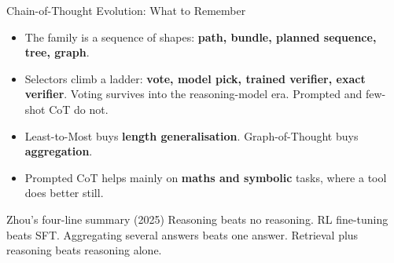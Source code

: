 \begin{frame}{Chain-of-Thought Evolution: What to Remember}
    \begin{itemize}\itemsep0.6em
        \item The family is a sequence of shapes: \textbf{path, bundle, planned sequence, tree, graph}.
        \item Selectors climb a ladder: \textbf{vote, model pick, trained verifier, exact verifier}. Voting survives into the reasoning-model era. Prompted and few-shot CoT do not.
        \item Least-to-Most buys \textbf{length generalisation}. Graph-of-Thought buys \textbf{aggregation}.
        \item Prompted CoT helps mainly on \textbf{maths and symbolic} tasks, where a tool does better still.
    \end{itemize}
    \vspace{0.3em}
    \begin{block}{Zhou's four-line summary (2025)}
        Reasoning beats no reasoning. RL fine-tuning beats SFT. Aggregating several answers beats one answer. Retrieval plus reasoning beats reasoning alone.
    \end{block}
    \vspace{0.3em}
\end{frame}

